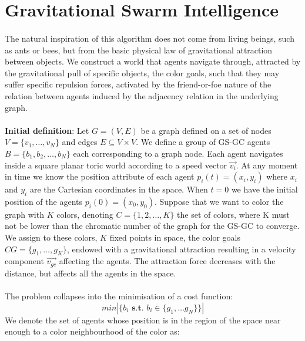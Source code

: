 \section{Gravitational Swarm Intelligence}
\paragraph*{} The natural inspiration of this algorithm does not come from living beings, such as ants or bees, but from the basic physical law of gravitational attraction between objects. We construct a world that agents navigate through, attracted by the gravitational pull of specific objects, the color goals, such that they may suffer specific repulsion forces, activated by the friend-or-foe nature of the relation between agents induced by the adjacency relation in the underlying graph.
\paragraph*{} \textbf{Initial definition}: Let $G = (V,E)$ be a graph defined on a set of nodes $V = \lbrace v_1,\ldots,v_N \rbrace$ and edges $E \subseteq V \times V$. We define a group of GS-GC agents $B = \lbrace b_1, b_2, \ldots , b_N \rbrace$ each corresponding to a graph node. Each agent navigates inside a square planar toric world according to a speed vector $\overrightarrow{v_i}$. At any moment in time we know the position attribute of each agent $p_i(t) = (x_i,y_i)$ where $x_i$ and $y_i$ are the Cartesian coordinates in the space. When $t = 0$ we have the initial position of the agents $p_i(0) = (x_0, y_0)$. Suppose that we want to color the graph with $K$ colors, denoting $C = \lbrace 1, 2, \ldots , K \rbrace$ the set of colors, where K must not be lower than the chromatic number of the graph for the GS-GC to converge. We assign to these colors, $K$ fixed points in space, the color goals $CG = \lbrace g_1 , \ldots , g_K \rbrace$, endowed with a gravitational attraction resulting in a  velocity component $\overrightarrow{v_{gc}}$ affecting the agents. The attraction force decreases with the distance, but affects all the agents in the space.
\paragraph*{} The problem collapses into the minimisation of a cost function:
\[ min | \lbrace b_i \textbf{ s.t. } b_i \in \lbrace g_1, \ldots g_N \rbrace \rbrace | \]
We denote the set of agents whose position is in the region of the space near enough to a color neighbourhood of the color as:


